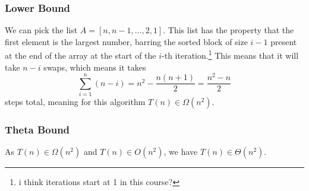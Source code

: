 \subsubsection*{Lower Bound}

We can pick the list $A = [n, n-1, \dots, 2, 1]$. This list has the property that the first element is the largest number, barring the sorted block of size $i - 1$ present at the end of the array at the start of the $i$-th iteration.\footnote{i think iterations start at 1 in this course?} This means that it will take $n - i$ swaps, which means it takes
\[
\sum_{i=1}^{n} (n - i) = n^2 - \frac{n(n+1)}{2} = \frac{n^2 - n}{2}
\]
steps total, meaning for this algorithm $T(n) \in \Omega(n^2)$.

\subsubsection*{Theta Bound}
As $T(n) \in \Omega(n^2)$ and $T(n) \in O(n^2)$, we have $T(n) \in \Theta(n^2)$. 
